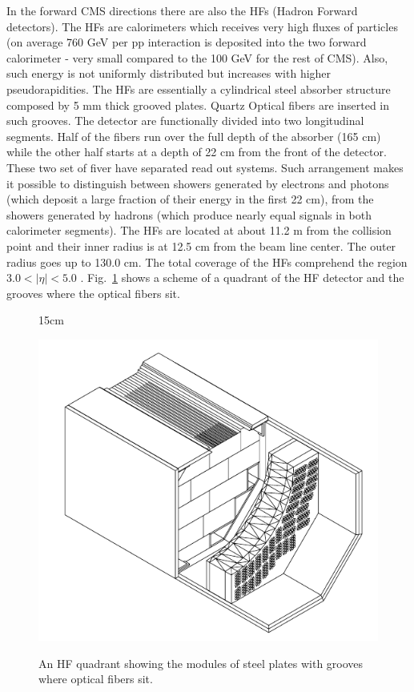 In the forward CMS directions there are also the HFs (Hadron Forward detectors). The HFs are calorimeters which receives very high fluxes of particles (on average 760 GeV per pp interaction is deposited into the two forward calorimeter - very small compared to the 100 GeV for the rest of CMS). Also, such energy is not uniformly distributed but increases with higher pseudorapidities. The HFs are essentially a cylindrical steel absorber structure composed by 5 mm thick grooved plates. Quartz Optical fibers are inserted in such grooves. The detector are functionally divided into two longitudinal segments. Half of the fibers run over the full depth of the absorber (165 cm) while the other half starts at a depth of 22 cm from the front of the detector. These two set of fiver have separated read out systems. Such arrangement makes it possible to distinguish between showers generated by electrons and photons (which deposit a large fraction of their energy in the first 22 cm), from the showers generated by hadrons (which produce nearly equal signals in both calorimeter segments). The HFs are located at about 11.2 m from the collision point and their inner radius is at 12.5 cm from the beam line center. The outer radius goes up to 130.0 cm. The total coverage of the HFs comprehend the region $3.0 < |\eta| < 5.0$ \cite{bib:JINST-3-362-2008,bib:hcal-tdr-1997}. Fig.~\ref{fig:hcal_hf} shows a scheme of a quadrant of the HF detector and the grooves where the optical fibers sit.

\begin{figure}[htbp]{15cm}
	\caption{An HF quadrant showing the modules of steel plates with grooves where optical fibers sit.}
	\includegraphics[scale=0.5]{ChapterCMS/figs/hcal_hf.png}
	\label{fig:hcal_hf}
\end{figure}


